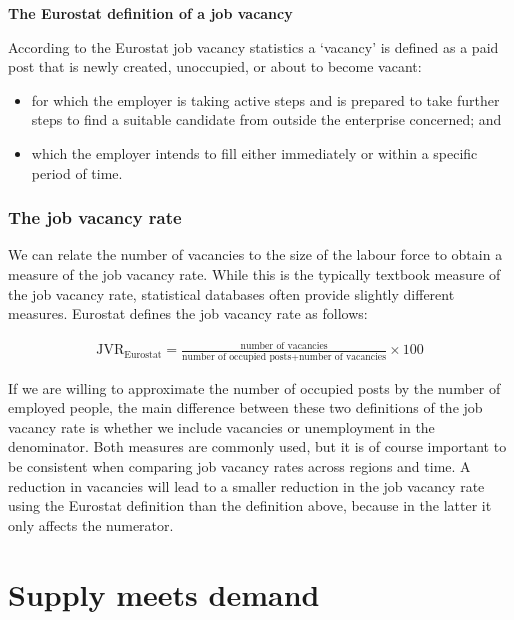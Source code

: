 \documentclass[
]{book}
\providecommand{\tightlist}{%
  \setlength{\itemsep}{0pt}\setlength{\parskip}{0pt}}
\begin{document}
\begin{myblock}
\textbf{The Eurostat definition of a job vacancy}

According to the Eurostat job vacancy statistics a `vacancy' is defined
as a paid post that is newly created, unoccupied, or about to become
vacant:

\begin{itemize}
\tightlist
\item
  for which the employer is taking active steps and is prepared to take
  further steps to find a suitable candidate from outside the enterprise
  concerned; and
\item
  which the employer intends to fill either immediately or within a
  specific period of time.
\end{itemize}
\end{myblock}

\hypertarget{the-job-vacancy-rate}{%
\subsubsection*{The job vacancy rate}\label{the-job-vacancy-rate}}

We can relate the number of vacancies to the size of the labour force to obtain a measure of the job vacancy rate. While this is the typically textbook measure of the job vacancy rate, statistical databases often provide slightly different measures. Eurostat defines the job vacancy rate as follows:

\begin{align}
  \text{JVR}_{\text{Eurostat}}=\frac{\text{number of vacancies}}{\text{number of occupied posts}+\text{number of vacancies}}\times 100
\end{align}

If we are willing to approximate the number of occupied posts by the number of employed people, the main difference between these two definitions of the job vacancy rate is whether we include vacancies or unemployment in the denominator. Both measures are commonly used, but it is of course important to be consistent when comparing job vacancy rates across regions and time. A reduction in vacancies will lead to a smaller reduction in the job vacancy rate using the Eurostat definition than the definition above, because in the latter it only affects the numerator.

\hypertarget{supply-meets-demand}{%
\section{Supply meets demand}\label{supply-meets-demand}}
\end{document}
